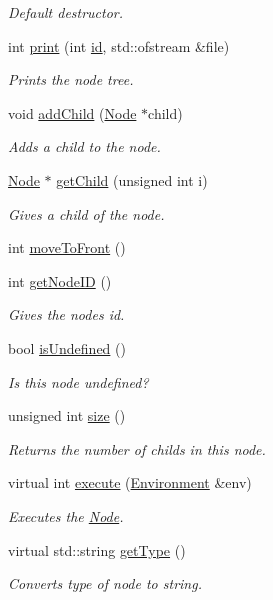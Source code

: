 \begin{DoxyCompactItemize}
\begin{DoxyCompactList}\small\item\em Default destructor. \end{DoxyCompactList}\item 
int \hyperlink{classNode_a6da281a118324b234071c80a554500cf}{print} (int \hyperlink{classNode_a59a543130a10c95f1e8642cf8c5645e8}{id}, std\+::ofstream \&file)
\begin{DoxyCompactList}\small\item\em Prints the node tree. \end{DoxyCompactList}\item 
void \hyperlink{classNode_a132699398b350e83b548a5645e69beb0}{add\+Child} (\hyperlink{classNode}{Node} $\ast$child)
\begin{DoxyCompactList}\small\item\em Adds a child to the node. \end{DoxyCompactList}\item 
\hyperlink{classNode}{Node} $\ast$ \hyperlink{classNode_a49395be2fd2be32e99c49df5bc5d2c6c}{get\+Child} (unsigned int i)
\begin{DoxyCompactList}\small\item\em Gives a child of the node. \end{DoxyCompactList}\item 
int \hyperlink{classNode_ae6c16dcf36a81a79b3b6e4adb51b229a}{move\+To\+Front} ()
\item 
int \hyperlink{classNode_a374c18bf6d7332e4a128107b8446d1ad}{get\+Node\+I\+D} ()
\begin{DoxyCompactList}\small\item\em Gives the nodes id. \end{DoxyCompactList}\item 
bool \hyperlink{classNode_a8a8a7a2ee9cd1bdf5a3e3cc374e678e6}{is\+Undefined} ()
\begin{DoxyCompactList}\small\item\em Is this node undefined? \end{DoxyCompactList}\item 
unsigned int \hyperlink{classNode_a985e47bbe8f5fade05f7accc2475794e}{size} ()
\begin{DoxyCompactList}\small\item\em Returns the number of childs in this node. \end{DoxyCompactList}\item 
virtual int \hyperlink{classNode_acc70d98952c4b061bc433c00180b7011}{execute} (\hyperlink{classEnvironment}{Environment} \&env)
\begin{DoxyCompactList}\small\item\em Executes the \hyperlink{classNode}{Node}. \end{DoxyCompactList}\item 
virtual std\+::string \hyperlink{classNode_abce0a9ddac6a5e2c0e546dbe6af02e3d}{get\+Type} ()
\begin{DoxyCompactList}\small\item\em Converts type of node to string. \end{DoxyCompactList}\end{DoxyCompactItemize}
